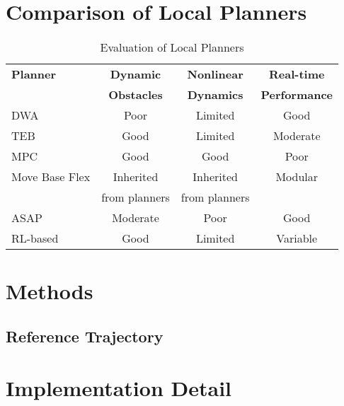 \documentclass[conference]{IEEEtran}
\begin{document}
\section{Comparison of Local Planners}

\begin{table}[h]
\centering
\caption{Evaluation of Local Planners}
\begin{tabular}{|l|c|c|c|}
\hline
\textbf{Planner} & \textbf{Dynamic} & \textbf{Nonlinear} & \textbf{Real-time} \\
                 & \textbf{Obstacles} & \textbf{Dynamics}  & \textbf{Performance} \\ \hline
DWA              & Poor               & Limited            & Good                \\ \hline
TEB              & Good               & Limited            & Moderate            \\ \hline
MPC              & Good               & Good               & Poor                \\ \hline
Move Base Flex   & Inherited          & Inherited          & Modular             \\
                 & from planners      & from planners      &                     \\ \hline
ASAP             & Moderate           & Poor               & Good                \\ \hline
RL-based         & Good               & Limited            & Variable            \\ \hline
\end{tabular}
\end{table}

\section{Methods}

\subsection{Reference Trajectory}


\section{Implementation Detail}



\end{document}
